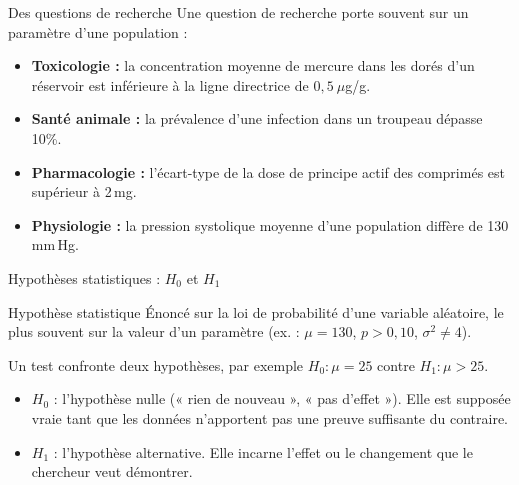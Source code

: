 \documentclass{BeamerTemplate}
\begin{document}
\begin{frame}[t]{Des questions de recherche}
  Une question de recherche porte souvent sur un \alert{paramètre} d'une population :
  \begin{itemize}\itemsep 3mm
    \item<1-> \textbf{Toxicologie :} la concentration moyenne de mercure dans les dorés d'un réservoir est \alert{inférieure} à la ligne directrice de $0{,}5\ \mu$g/g.
    \item<2-> \textbf{Santé animale :} la prévalence d'une infection dans un troupeau \alert{dépasse} 10\%.
    \item<3-> \textbf{Pharmacologie :} l'écart-type de la dose de principe actif des comprimés est \alert{supérieur} à 2\,mg.
    \item<4-> \textbf{Physiologie :} la pression systolique moyenne d'une population \alert{diffère} de 130\,mm\,Hg.
  \end{itemize}

  \bigskip
\end{frame}

\begin{frame}[t]{Hypothèses statistiques : $H_0$ et $H_1$}
  \begin{Boite}{Hypothèse statistique}
    Énoncé sur la loi de probabilité d'une variable aléatoire, le plus souvent sur la valeur d'un paramètre (ex. : $\mu = 130$, $p > 0{,}10$, $\sigma^2 \ne 4$).
  \end{Boite}

  \vspace{-1mm}
  Un test confronte deux hypothèses, par exemple $H_0 : \mu = 25$ contre $H_1 : \mu > 25$.
  \begin{itemize}\itemsep 2mm
    \item<2-> $H_0$ : l'\alert{hypothèse nulle} (« rien de nouveau », « pas d'effet »). Elle est \alert{supposée vraie} tant que les données n'apportent pas une preuve suffisante du contraire.
    \item<3-> $H_1$ : l'\alert{hypothèse alternative}. Elle incarne l'effet ou le changement que le chercheur veut \alert{démontrer}.
  \end{itemize}
\end{frame}
\end{document}
